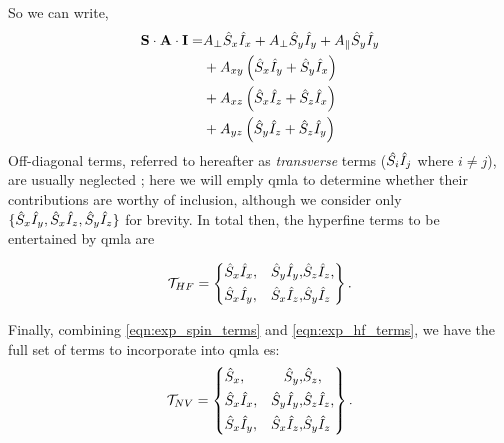 So we can write, 
\begin{equation}
    \begin{split}
        \mathbf{S} \cdot \mathbf{A} \cdot \mathbf{I} 
        = &A_{\perp} \hat{S}_x \hat{I}_x + A_{\perp} \hat{S}_y \hat{I}_y + A_{\|} \hat{S}_y \hat{I}_y \\
        &+ A_{xy} \left( \hat{S}_x \hat{I}_y + \hat{S}_y \hat{I}_x \right) \\
        &+ A_{xz} \left( \hat{S}_x \hat{I}_z + \hat{S}_z \hat{I}_x \right) \\
        &+ A_{yz} \left( \hat{S}_y \hat{I}_z + \hat{S}_z \hat{I}_y \right) \\
    \end{split}
\end{equation}
Off-diagonal terms, referred to hereafter as \emph{transverse} terms ($\hat{S_i}\hat{I}_j$ where $i\neq j$),
    are usually neglected \cite{blok2014manipulating}; 
    here we will emply \gls{qmla} to determine whether their contributions are worthy of inclusion, 
    although we consider only $\{ \hat{S}_x\hat{I}_y, \hat{S}_x\hat{I}_z, \hat{S}_y\hat{I}_z\}$ for brevity. 
In total then, the hyperfine terms to be entertained by \gls{qmla} are 

\begin{equation}
    \label{eqn:exp_hf_terms}
    { \mathcal{T} }_{HF} = \left\{
        \begin{split}
        & \hat{S}_x\hat{I}_x, & \hat{S}_y\hat{I}_y, & \hat{S}_z\hat{I}_z, \\
        & \hat{S}_x\hat{I}_y, & \hat{S}_x\hat{I}_z, & \hat{S}_y\hat{I}_z 
        \end{split}
    \right\}.
\end{equation}

\par 

Finally, combining \cref{eqn:exp_spin_terms} and \cref{eqn:exp_hf_terms}, 
    we have the full set of terms to incorporate into \gls{qmla} \gls{es}: 
\begin{equation}
    \label{eqn:nv_terms_verbose}
    { \mathcal{T} }_{NV} = \left\{
        \begin{split}
        &\hat{S}_x,  & \hat{S}_y,  & \hat{S}_z, \\
        &\hat{S}_x \hat{I}_x,  & \hat{S}_y\hat{I}_y, &  \hat{S}_z\hat{I}_z, \\
        &\hat{S}_x\hat{I}_y,  & \hat{S}_x\hat{I}_z,  & \hat{S}_y\hat{I}_z 
        \end{split}
    \right\}.
\end{equation}
\par 

